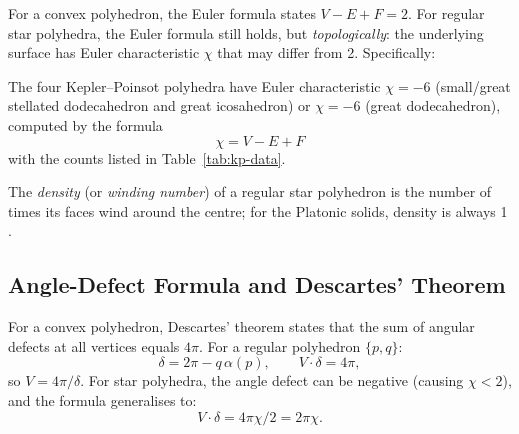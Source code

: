 For a convex polyhedron, the Euler formula states
\(V - E + F = 2\).  For regular star polyhedra, the Euler
formula still holds, but \emph{topologically}: the underlying
surface has Euler characteristic $\chi$ that may differ from
2.  Specifically:

\begin{proposition}
\label{prop:euler-kp}
The four Kepler–Poinsot polyhedra have Euler characteristic
\(\chi = -6\) (small/great stellated dodecahedron and great
icosahedron) or \(\chi = -6\) (great dodecahedron), computed
by the formula
\[
  \chi = V - E + F
\]
with the counts listed in Table~\ref{tab:kp-data}.
\end{proposition}

\begin{table}[h]
\centering
\caption{Combinatorial data for the four Kepler–Poinsot polyhedra.}
\label{tab:kp-data}
\end{table}

The \emph{density} (or \emph{winding number}) of a regular star
polyhedron is the number of times its faces wind around the
centre; for the Platonic solids, density is always 1
\cite{coxeter_regular_polytopes}.

\subsection{Angle-Defect Formula and Descartes' Theorem}
\label{ssec:angle-defect}

For a convex polyhedron, Descartes' theorem states that the sum
of angular defects at all vertices equals $4\pi$.  For a
regular polyhedron \(\{p,q\}\):
\[
  \delta = 2\pi - q\,\alpha(p),
  \qquad
  V\cdot\delta = 4\pi,
\]
so $V = 4\pi / \delta$.  For star polyhedra, the angle
defect can be negative (causing \(\chi < 2\)), and the formula
generalises to:
\[
  V\cdot\delta = 4\pi\chi/2 = 2\pi\chi.
\]

